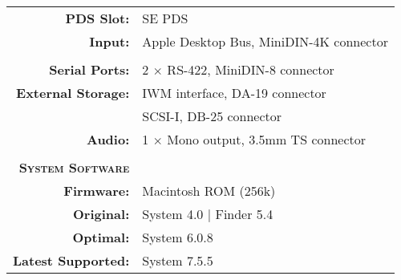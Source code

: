 \begin{tabular}{ r p{6in} }
\textbf{PDS Slot:} & SE PDS \\
\textbf{Input:} & Apple Desktop Bus, MiniDIN-4K connector \\
\\
\textbf{Serial Ports:} & 2 \(\times\) RS-422, MiniDIN-8 connector \\
\textbf{External Storage:} & IWM interface, DA-19 connector \\
~ & SCSI-I, DB-25 connector \\
\textbf{Audio:} & 1 \(\times\) Mono output, 3.5mm TS connector \\
\\
\textbf{\textsc{System Software}} & ~ \\
\textbf{Firmware:} & Macintosh ROM (256k) \\
\textbf{Original:} & System 4.0 | Finder 5.4 \\
\textbf{Optimal:} & System 6.0.8 \\
\textbf{Latest Supported:} & System 7.5.5 \\
\end{tabular}